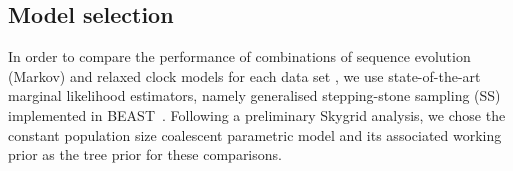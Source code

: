 \documentclass[10pt]{article}
\begin{document}
\subsection*{Model selection}

In order to compare the performance of combinations of sequence evolution (Markov) and relaxed clock models for each data set
, we use state-of-the-art marginal likelihood estimators, namely generalised stepping-stone sampling (SS)~\citep{Baele2015} implemented in BEAST~\citep{Suchard2018}.
Following a preliminary Skygrid analysis, we chose the constant population size coalescent parametric model and its associated working prior as the tree prior for these comparisons.


\end{document}
